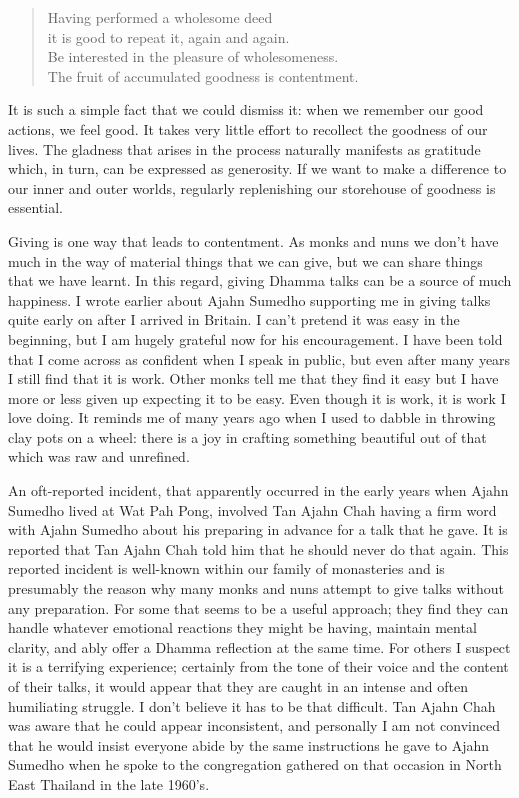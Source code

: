 \clearpage

\begin{quote}
  Having performed a wholesome deed\\
  it is good to repeat it, again and again.\\
  Be interested in the pleasure of wholesomeness.\\
  The fruit of accumulated goodness is contentment.
\end{quote}

It is such a simple fact that we could dismiss it: when we remember our
good actions, we feel good. It takes very little effort to recollect the
goodness of our lives. The gladness that arises in the process naturally
manifests as gratitude which, in turn, can be expressed as generosity.
If we want to make a difference to our inner and outer worlds, regularly
replenishing our storehouse of goodness is essential.

Giving is one way that leads to contentment. As monks and nuns we don't
have much in the way of material things that we can give, but we can
share things that we have learnt. In this regard, giving Dhamma talks
can be a source of much happiness. I wrote earlier about Ajahn Sumedho
supporting me in giving talks quite early on after I arrived in Britain.
I can't pretend it was easy in the beginning, but I am hugely grateful
now for his encouragement. I have been told that I come across as
confident when I speak in public, but even after many years I still find
that it is work. Other monks tell me that they find it easy but I have
more or less given up expecting it to be easy. Even though it is work,
it is work I love doing. It reminds me of many years ago when I used to
dabble in throwing clay pots on a wheel: there is a joy in crafting
something beautiful out of that which was raw and unrefined.

An oft-reported incident, that apparently occurred in the early years
when Ajahn Sumedho lived at Wat Pah Pong, involved Tan Ajahn Chah having
a firm word with Ajahn Sumedho about his preparing in advance for a talk
that he gave. It is reported that Tan Ajahn Chah told him that he should
never do that again. This reported incident is well-known within our family of
monasteries and is presumably the reason why many monks and nuns attempt
to give talks without any preparation. For some that seems to be a
useful approach; they find they can handle whatever emotional reactions
they might be having, maintain mental clarity, and ably offer a Dhamma
reflection at the same time. For others I suspect it is a terrifying
experience; certainly from the tone of their voice and the content of
their talks, it would appear that they are caught in an intense and
often humiliating struggle. I don't believe it has to be that difficult.
Tan Ajahn Chah was aware that he could appear inconsistent, and
personally I am not convinced that he would insist everyone abide by the
same instructions he gave to Ajahn Sumedho when he spoke to the congregation
gathered on that occasion in North East Thailand in the late 1960's.

